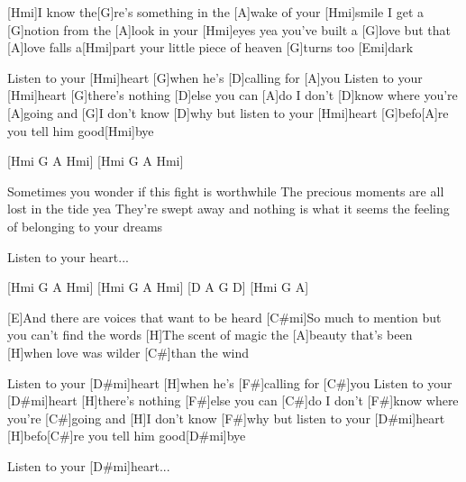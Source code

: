 
[Hmi]I know the[G]re's something in the [A]wake of your [Hmi]smile
I get a [G]notion from the [A]look in your [Hmi]eyes yea
you've built a [G]love but that [A]love falls a[Hmi]part
your little piece of heaven [G]turns too [Emi]dark

Listen to your [Hmi]heart
[G]when he's [D]calling for [A]you
Listen to your [Hmi]heart
[G]there's nothing [D]else you can [A]do
I don't [D]know where you're [A]going
and [G]I don't know [D]why
but listen to your [Hmi]heart
[G]befo[A]re you tell him good[Hmi]bye

[Hmi G A Hmi] [Hmi G A Hmi]

Sometimes you wonder if this fight is worthwhile
The precious moments are all lost in the tide yea
They're swept away and nothing is what it seems
the feeling of belonging to your dreams

Listen to your heart...

[Hmi G A Hmi] [Hmi G A Hmi] [D A G D] [Hmi G A]

[E]And there are voices that want to be heard
[C#mi]So much to mention but you can't find the words
[H]The scent of magic the [A]beauty that's been
[H]when love was wilder [C#]than the wind

Listen to your [D#mi]heart
[H]when he's [F#]calling for [C#]you
Listen to your [D#mi]heart
[H]there's nothing [F#]else you can [C#]do
I don't [F#]know where you're [C#]going
and [H]I don't know [F#]why
but listen to your [D#mi]heart
[H]befo[C#]re you tell him good[D#mi]bye

Listen to your [D#mi]heart...

